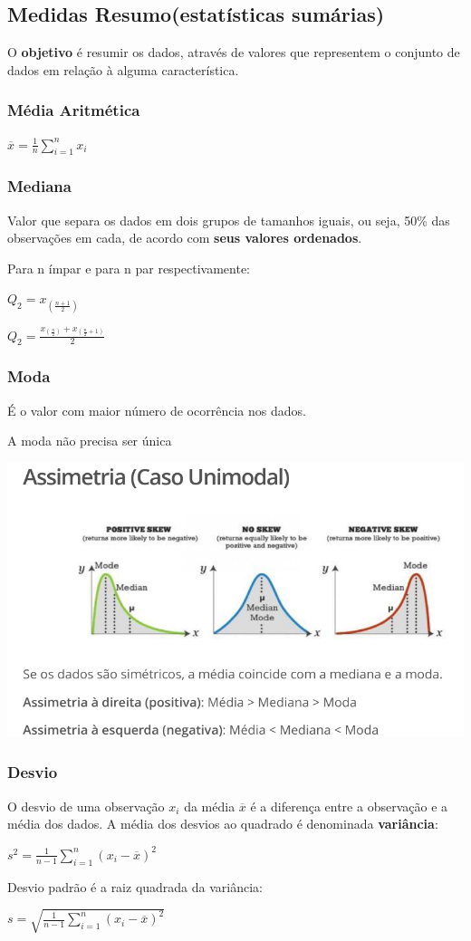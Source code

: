 \documentclass[a4paper, 12pt]{article}
\begin{document}
\subsection{Medidas Resumo(estatísticas sumárias)}
	O \textbf{objetivo} é resumir os dados, através de valores que representem o conjunto de dados em relação à alguma característica.
\subsubsection{Média Aritmética}
	\begin{center}
		\LARGE
		$\overline{x} = \frac{1}{n} \sum_{i = 1}^{n} x_{i}$
	\end{center}
\subsubsection{Mediana}
	Valor que separa os dados em dois grupos de tamanhos iguais, ou seja, 50\% das observações em cada, de acordo com \textbf{seus valores ordenados}.
	
	Para n ímpar e para n par respectivamente:
	\begin{center}
		\LARGE
		$
		Q_{2} = x_{(\frac{n+1}{2})}
		$
		
		$
		Q_{2} = \frac{x_{(\frac{n}{2})} + x_{(\frac{n}{2} + 1)}}{2}
		$
	\end{center}

\subsubsection{Moda}
	É o valor com maior número de ocorrência nos dados.
	
	A moda não precisa ser única

	\begin{center}
		\includegraphics[width=0.7\linewidth]{imagens/moda.png}
	\end{center}
\subsubsection{Desvio}
	O desvio de uma observação $x_{i}$ da média $\overline{x}$ é a diferença entre a observação e a média dos dados.
	A média dos desvios ao quadrado é denominada \textbf{variância}:
	\begin{center}
		\LARGE
		$
		s^{2} = \frac{1}{n-1}\sum_{i = 1}^{n}(x_{i} - \overline{x})^{2}
		$
	\end{center}
	Desvio padrão é a raiz quadrada da variância:
	\begin{center}
		\LARGE
		$
		s = \sqrt{\frac{1}{n-1}\sum_{i = 1}^{n}(x_{i} - \overline{x})^{2}}
		$
	\end{center}
	
\end{document}
